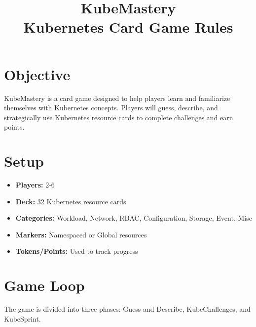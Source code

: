 \documentclass{article}
\title{KubeMastery \\ \large Kubernetes Card Game Rules}
\author{}
\date{}
\begin{document}
\maketitle

\section*{Objective}
KubeMastery is a card game designed to help players learn and familiarize themselves with Kubernetes concepts. Players will guess, describe, and strategically use Kubernetes resource cards to complete challenges and earn points.

\section*{Setup}
\begin{itemize}
    \item \textbf{Players:} 2-6
    \item \textbf{Deck:} 32 Kubernetes resource cards
    \item \textbf{Categories:} Workload, Network, RBAC, Configuration, Storage, Event, Misc
    \item \textbf{Markers:} Namespaced or Global resources
    \item \textbf{Tokens/Points:} Used to track progress
\end{itemize}

\section*{Game Loop}
The game is divided into three phases: Guess and Describe, KubeChallenges, and KubeSprint.
\end{document}
